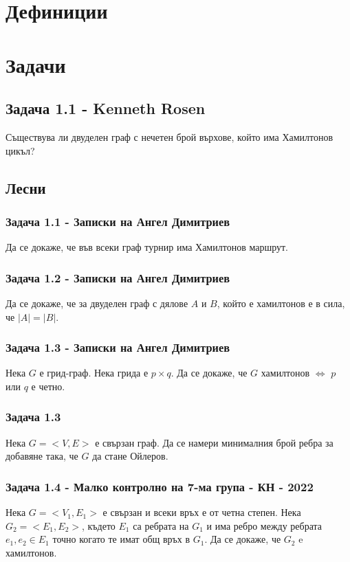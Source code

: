 \documentclass[12pt]{article}
\begin{document}
\section*{Дефиниции}

\section*{Задачи}
\subsection*{Задача 1.1 - Kenneth Rosen}
Съществува ли двуделен граф с нечетен брой върхове, който има Хамилтонов цикъл?

\subsection*{Лесни}
\subsubsection*{Задача 1.1 - Записки на Ангел Димитриев}
Да се докаже, че във всеки граф турнир има Хамилтонов маршрут.
\subsubsection*{Задача 1.2 - Записки на Ангел Димитриев}
Да се докаже, че за двуделен граф с дялове $A$ и $B$, който е хамилтонов е в сила, че $|A| = |B|$. \subsubsection*{Задача 1.3 - Записки на Ангел Димитриев}
Нека $G$ е грид-граф. Нека грида е $p \times q$. Да се докаже, че $G$ хамилтонов $\iff$ $p$ или $q$ е четно.
\subsubsection*{Задача 1.3}
Нека $G = <V, E>$ е свързан граф. Да се намери минималния брой ребра за добавяне така, че $G$ да стане Ойлеров.
\subsubsection*{Задача 1.4 - Малко контролно на 7-ма група - КН - 2022}
Нека $G = <V_1, E_1>$ е свързан и всеки връх е от четна степен. Нека $G_2 = <E_1, E_2>$, където $E_1$ са ребрата на $G_1$ и има ребро между ребрата $e_1, e_2 \in E_1$ точно когато те имат общ връх в $G_1$. Да се докаже, че $G_2$ e хамилтонов.
\end{document}
